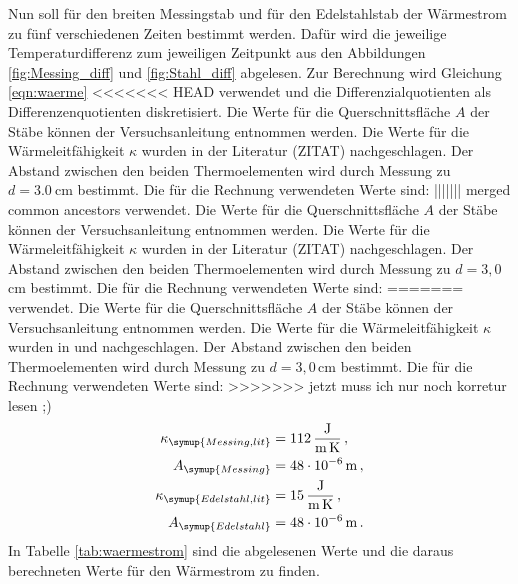 Nun soll für den breiten Messingstab und für den Edelstahlstab der Wärmestrom
zu fünf verschiedenen Zeiten bestimmt werden. Dafür wird die jeweilige Temperaturdifferenz
zum jeweiligen Zeitpunkt aus den Abbildungen \ref{fig:Messing_diff} und
\ref{fig:Stahl_diff} abgelesen. Zur Berechnung wird Gleichung \eqref{eqn:waerme}
<<<<<<< HEAD
verwendet und die Differenzialquotienten als Differenzenquotienten diskretisiert. Die Werte für die Querschnittsfläche $A$ der Stäbe können der Versuchsanleitung
\cite{Versuchsanleitung} entnommen werden. Die Werte für die Wärmeleitfähigkeit $\kappa$ wurden in der
Literatur (ZITAT) nachgeschlagen. Der Abstand zwischen den beiden Thermoelementen
wird durch Messung zu $d=\SI{3.0}{\centi\meter}$ bestimmt. Die für die Rechnung verwendeten Werte sind:
||||||| merged common ancestors
verwendet. Die Werte für die Querschnittsfläche $A$ der Stäbe können der Versuchsanleitung
\cite{Versuchsanleitung} entnommen werden. Die Werte für die Wärmeleitfähigkeit $\kappa$ wurden in der
Literatur (ZITAT) nachgeschlagen. Der Abstand zwischen den beiden Thermoelementen
wird durch Messung zu $d=3,0$\,cm bestimmt. Die für die Rechnung verwendeten Werte sind:
=======
verwendet. Die Werte für die Querschnittsfläche $A$ der Stäbe können der Versuchsanleitung
\cite{Versuchsanleitung} entnommen werden. Die Werte für die Wärmeleitfähigkeit $\kappa$ wurden
in \cite{Wärmeleitfähigkeit1} und \cite{Wärmeleitfähigkeit3}
nachgeschlagen. Der Abstand zwischen den beiden Thermoelementen
wird durch Messung zu $d=3,0$\,cm bestimmt. Die für die Rechnung verwendeten Werte sind:
>>>>>>> jetzt muss ich nur noch korretur lesen ;)
\begin{align}
  \kappa_{\symup{Messing,lit}} &= \SI{112}{\joule\per\meter\per\kelvin}\,, \nonumber\\
  A_{\symup{Messing}} &= \SI{48e-6}{\meter}\,, \nonumber\\
  \kappa_{\symup{Edelstahl,lit}} &= \SI{15}{\joule\per\meter\per\kelvin}\,, \nonumber\\
  A_{\symup{Edelstahl}} &= \SI{48e-6}{\meter}\,. \nonumber
\end{align}
In Tabelle \ref{tab:waermestrom} sind die abgelesenen Werte und die daraus berechneten Werte
für den Wärmestrom zu finden.

